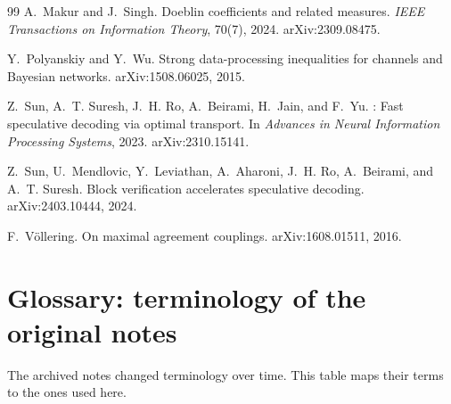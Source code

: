\documentclass[11pt]{article}
\theoremstyle{definition}
\begin{document}
\begin{thebibliography}{99}
A.~Makur and J.~Singh.
\newblock Doeblin coefficients and related measures.
\newblock \emph{IEEE Transactions on Information Theory}, 70(7), 2024.
\newblock arXiv:2309.08475.

Y.~Polyanskiy and Y.~Wu.
\newblock Strong data-processing inequalities for channels and {B}ayesian networks.
\newblock arXiv:1508.06025, 2015.

Z.~Sun, A.~T. Suresh, J.~H. Ro, A.~Beirami, H.~Jain, and F.~Yu.
: Fast speculative decoding via optimal transport.
\newblock In \emph{Advances in Neural Information Processing Systems}, 2023.
\newblock arXiv:2310.15141.

Z.~Sun, U.~Mendlovic, Y.~Leviathan, A.~Aharoni, J.~H. Ro, A.~Beirami, and A.~T. Suresh.
\newblock Block verification accelerates speculative decoding.
\newblock arXiv:2403.10444, 2024.

F.~V\"ollering.
\newblock On maximal agreement couplings.
\newblock arXiv:1608.01511, 2016.

\end{thebibliography}

\appendix

\section{Glossary: terminology of the original notes}\label{app:glossary}

The archived notes changed terminology over time. This table maps their terms
to the ones used here.
\end{document}
